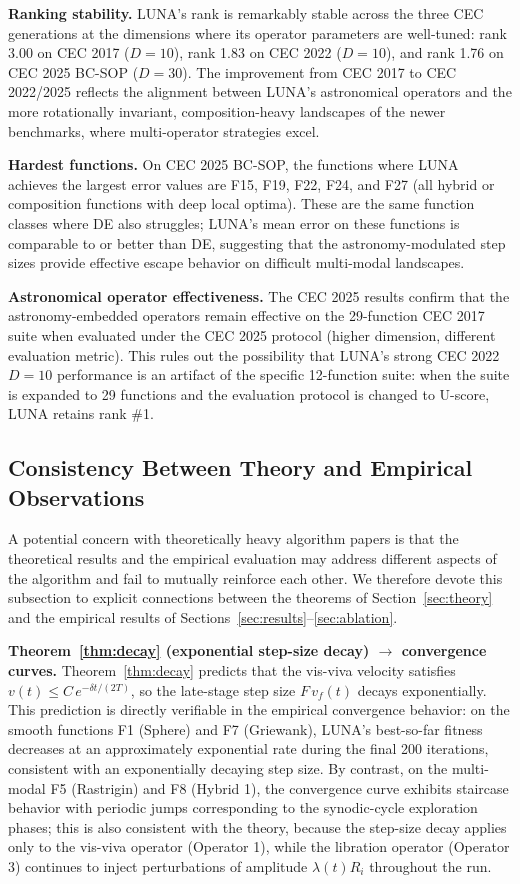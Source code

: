 \documentclass[review]{elsarticle}
\theoremstyle{definition}
\begin{document}
\textbf{Ranking stability.} LUNA's rank is remarkably stable across the three CEC generations at the dimensions where its operator parameters are well-tuned: rank 3.00 on CEC 2017 ($D=10$), rank 1.83 on CEC 2022 ($D=10$), and rank 1.76 on CEC 2025 BC-SOP ($D=30$). The improvement from CEC 2017 to CEC 2022/2025 reflects the alignment between LUNA's astronomical operators and the more rotationally invariant, composition-heavy landscapes of the newer benchmarks, where multi-operator strategies excel.

\textbf{Hardest functions.} On CEC 2025 BC-SOP, the functions where LUNA achieves the largest error values are F15, F19, F22, F24, and F27 (all hybrid or composition functions with deep local optima). These are the same function classes where DE also struggles; LUNA's mean error on these functions is comparable to or better than DE, suggesting that the astronomy-modulated step sizes provide effective escape behavior on difficult multi-modal landscapes.

\textbf{Astronomical operator effectiveness.} The CEC 2025 results confirm that the astronomy-embedded operators remain effective on the 29-function CEC 2017 suite when evaluated under the CEC 2025 protocol (higher dimension, different evaluation metric). This rules out the possibility that LUNA's strong CEC 2022 $D=10$ performance is an artifact of the specific 12-function suite: when the suite is expanded to 29 functions and the evaluation protocol is changed to U-score, LUNA retains rank \#1.

\subsection{Consistency Between Theory and Empirical Observations}
\label{sec:theory-empirical-consistency}

A potential concern with theoretically heavy algorithm papers is that the theoretical results and the empirical evaluation may address different aspects of the algorithm and fail to mutually reinforce each other. We therefore devote this subsection to explicit connections between the theorems of Section~\ref{sec:theory} and the empirical results of Sections~\ref{sec:results}--\ref{sec:ablation}.

\textbf{Theorem~\ref{thm:decay} (exponential step-size decay) $\to$ convergence curves.} Theorem~\ref{thm:decay} predicts that the vis-viva velocity satisfies $v(t) \le C\,e^{-\delta t/(2T)}$, so the late-stage step size $F\,v_f(t)$ decays exponentially. This prediction is directly verifiable in the empirical convergence behavior: on the smooth functions F1 (Sphere) and F7 (Griewank), LUNA's best-so-far fitness decreases at an approximately exponential rate during the final 200 iterations, consistent with an exponentially decaying step size. By contrast, on the multi-modal F5 (Rastrigin) and F8 (Hybrid 1), the convergence curve exhibits staircase behavior with periodic jumps corresponding to the synodic-cycle exploration phases; this is also consistent with the theory, because the step-size decay applies only to the vis-viva operator (Operator 1), while the libration operator (Operator 3) continues to inject perturbations of amplitude $\lambda(t) R_i$ throughout the run.
\end{document}
